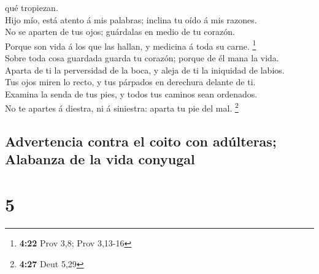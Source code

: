 qué tropiezan.\\
 Hijo mío, está atento á mis palabras; inclina tu oído á
mis razones.\\
 No se aparten de tus ojos; guárdalas en medio de tu
corazón.\\
 Porque son vida á los que las hallan, y medicina á toda su
carne. \footnote{\textbf{4:22} Prov 3,8; Prov 3,13-16}\\
 Sobre toda cosa guardada guarda tu corazón; porque de él
mana la vida.\\
 Aparta de ti la perversidad de la boca, y aleja de ti la
iniquidad de labios.\\
 Tus ojos miren lo recto, y tus párpados en derechura
delante de ti.\\
 Examina la senda de tus pies, y todos tus caminos sean
ordenados.\\
 No te apartes á diestra, ni á siniestra: aparta tu pie del
mal. \footnote{\textbf{4:27} Deut 5,29}

\hypertarget{advertencia-contra-el-coito-con-aduxfalteras-alabanza-de-la-vida-conyugal}{%
\subsection{Advertencia contra el coito con adúlteras; Alabanza de la
vida
conyugal}\label{advertencia-contra-el-coito-con-aduxfalteras-alabanza-de-la-vida-conyugal}}

\hypertarget{section-4}{%
\section{5}\label{section-4}}

